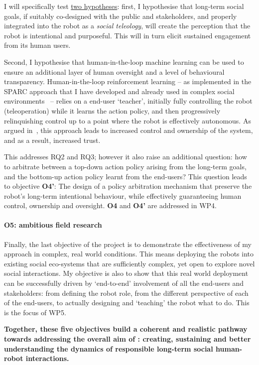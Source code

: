 I will specifically test \ul{two hypotheses}: first, I hypothesise that long-term
social goals, if suitably co-designed with the public and stakeholders, and
properly integrated into the robot as a \emph{social teleology}, will create the
perception that the robot is intentional and purposeful. This will in turn
elicit sustained engagement from its human users.

Second, I hypothesise that human-in-the-loop machine learning can be used to
ensure an additional layer of human oversight and a level of behavioural
transparency.  Human-in-the-loop reinforcement learning -- as implemented in the SPARC
approach that I have developed and already used in complex social
environments~\cite{senft2017supervised, senft2019teaching, winkle2020couch} -- relies
on a end-user `teacher', initially fully controlling the robot (teleoperation)
while it learns the action policy, and then progressively relinquishing control
up to a point where the robot is effectively autonomous. As argued
in~\cite{senft2019teaching}, this approach leads to increased control and
ownership of the system, and as a result, increased trust.

This addresses RQ2 and RQ3; however it also raise an additional question: how to
arbitrate between a top-down action policy arising from the long-term goals, and
the bottom-up action policy learnt from the end-users? This question leads to
objective {\bf O4'}: The design of a policy arbitration mechanism that preserve
the robot's long-term intentional behaviour, while effectively guaranteeing human
control, ownership and oversight. {\bf O4} and {\bf O4'} are addressed in WP4.

\paragraph{\bf O5: ambitious field research} Finally, the last objective of the
\project project is to demonstrate the effectiveness of my approach in complex,
real world conditions. This means deploying the \project robots into existing
social eco-systems that are sufficiently complex, yet open to explore novel
social interactions. My objective is also to show that this real world
deployment can be successfully driven by `end-to-end' involvement of all the
end-users and stakeholders: from defining the robot role, from the different
perspective of each of the end-users, to actually designing and `teaching' the
robot what to do. This is the focus of WP5.


\begin{framed}

\noindent\bf Together, these five objectives build a coherent and realistic pathway towards
addressing the overall aim of \project: creating, sustaining and better
understanding the dynamics of responsible long-term social human-robot
interactions.

\end{framed}

